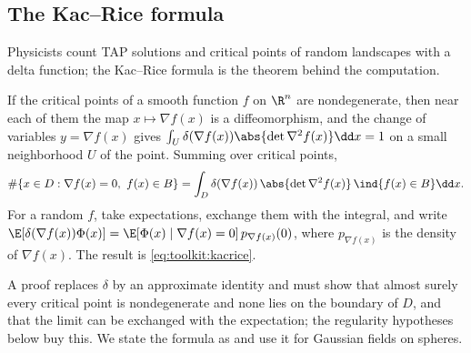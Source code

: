 \begin{refsection}
\section{The Kac--Rice formula}\label{sec:toolkit:kacrice}

Physicists count TAP solutions and critical points of random landscapes with a delta function; the Kac--Rice formula is the theorem behind the computation.

\begin{heuristic}
If the critical points of a smooth function $f$ on $\R^n$ are nondegenerate, then near each of them the map $x\mapsto\nabla f(x)$ is a diffeomorphism, and the change of variables $y=\nabla f(x)$ gives $\int_U\delta(\nabla f(x))\abs{\det\nabla^2f(x)}\dd x=1$ on a small neighborhood $U$ of the point. Summing over critical points,
\[
\#\{x\in D:\nabla f(x)=0,\ f(x)\in B\}=\int_D\delta(\nabla f(x))\,\abs{\det\nabla^2f(x)}\,\ind\{f(x)\in B\}\dd x.
\]
For a random $f$, take expectations, exchange them with the integral, and write $\E[\delta(\nabla f(x))\Phi(x)]=\E[\Phi(x)\mid\nabla f(x)=0]\,p_{\nabla f(x)}(0)$, where $p_{\nabla f(x)}$ is the density of $\nabla f(x)$. The result is \eqref{eq:toolkit:kacrice}.
\end{heuristic}

A proof replaces $\delta$ by an approximate identity and must show that almost surely every critical point is nondegenerate and none lies on the boundary of $D$, and that the limit can be exchanged with the expectation; the regularity hypotheses below buy this. We state the formula as \textcite[Lemma~3.1]{AuffingerBenArousCerny2013} and \textcite[Lemma~1]{BenArousMeiMontanariNica2019} use it for Gaussian fields on spheres.


\end{refsection}
